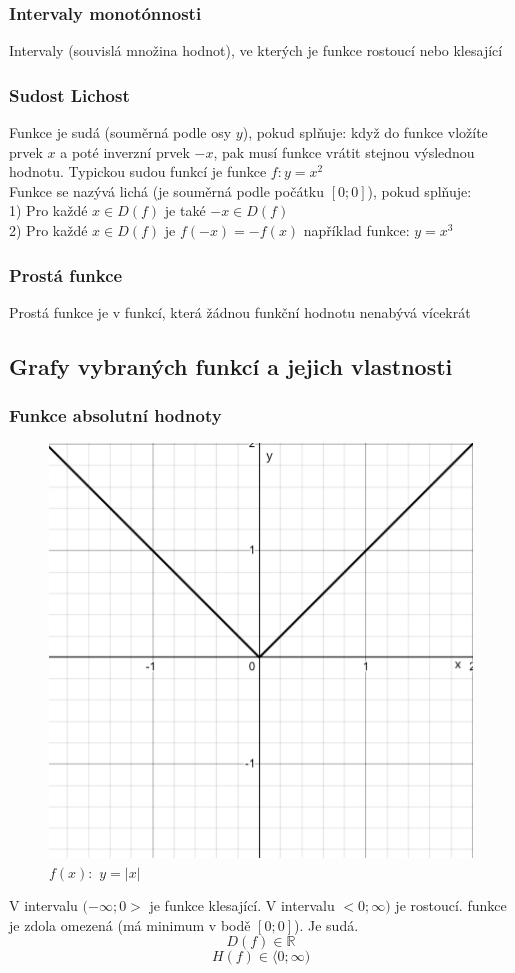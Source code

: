 \subsubsection{Intervaly monotónnosti}
Intervaly (souvislá množina hodnot), ve kterých je funkce rostoucí nebo klesající
\subsubsection{Sudost Lichost}
Funkce je sudá (souměrná podle osy $y$), pokud splňuje: když do funkce vložíte prvek $x$ a poté inverzní prvek $-x$, pak musí funkce vrátit stejnou výslednou hodnotu. Typickou sudou funkcí je funkce $f: y=x^2$ \\

Funkce se nazývá lichá (je souměrná podle počátku $[0;0]$), pokud splňuje:  \\
1) Pro každé $x \in D(f)$ je také $-x \in D(f)$ \\
2) Pro každé $x \in D(f)$ je $f(-x) = - f(x)$
například funkce: $y=x^3$
\subsubsection{Prostá funkce}
Prostá funkce je v funkcí, která žádnou funkční hodnotu nenabývá vícekrát
\subsection{Grafy vybraných funkcí a jejich vlastnosti}
\subsubsection{Funkce absolutní hodnoty}
\begin{figure}[H]
        \centering
        \includegraphics[width=0.5\linewidth]{img/2_absolutni_hodnota.png}
        \caption{$f(x):$ $y=|x|$} 
        \label{fig:enter-label}
    \end{figure}
V intervalu $(-\infty; 0> $ je funkce klesající. V intervalu $<0;\infty)$ je rostoucí. funkce je zdola omezená (má minimum v bodě $[0;0]$). Je sudá.
$$
    D(f)\in \mathbb{R} 
$$
$$
    H(f)\in\langle0;\infty)
$$
